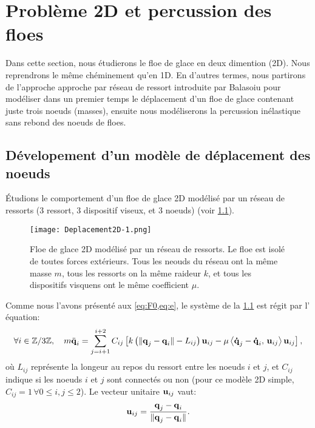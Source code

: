 
\chapter{Problème 2D et percussion des floes} %

\label{Chapter4} %




Dans cette section, nous étudierons le floe de glace en deux dimention (2D). Nous reprendrons le même chéminement qu'en 1D. En d'autres termes, nous partirons de l'approche approche par réseau de ressort introduite par Balasoiu pour modéliser dans un premier temps le déplacement d'un floe de glace contenant juste trois noeuds (masses), ensuite nous modéliserons la percussion inélastique sans rebond des noeuds de floes. 







\section{Dévelopement d'un modèle de déplacement des noeuds}








Étudions le comportement d'un floe de glace 2D modélisé par un réseau de ressorts (3 ressort, 3 dispositif viseux, et 3 noeuds) (voir \cref{fig:deplacement2d}).
\begin{figure}[!h]
    \centering
    \texttt{[image: Deplacement2D-1.png]}
    \caption{Floe de glace 2D modélisé par un réseau de ressorts. Le floe est isolé de toutes forces extérieurs. Tous les neouds du réseau ont la même masse $m$, tous les ressorts on la même raideur $k$, et tous les dispositifs visquens ont le même coefficient $\mu$.}
    \label{fig:deplacement2d}
\end{figure}


\noindent Comme nous l'avons présenté aux \cref{eq:F0,eq:e}, le système de la \cref{fig:deplacement2d} est régit par l' équation:
\begin{align} \label{eq:eprime2}
    \forall i \in \mathbb{Z}/3\mathbb{Z}, \quad m \ddot{\bm{\mathrm{q}}}_i = \sum_{j=i+1}^{i+2}C_{ij} \left[  k \left( \Vert \bm{\mathrm{q}}_j - \bm{\mathrm{q}}_i \Vert - L_{ij} \right) \bm{\mathrm{u}}_{ij} - \mu \left\langle \bm{\mathrm{\dot{q}}}_j - \bm{\mathrm{\dot{q}}}_i, \, \bm{\mathrm{u}}_{ij}  \right\rangle  \bm{\mathrm{u}}_{ij}  \right]  , 
\end{align}
où $L_{ij}$ représente la longeur au repos du ressort entre les noeuds $i$ et $j$, et $C_{ij}$ indique si les noeuds $i$ et $j$ sont connectés ou non (pour ce modèle 2D simple, $C_{ij} = 1 \, \forall 0 \leq i,j \leq 2$). Le vecteur unitaire $\bm{\mathrm{u}}_{ij}$ vaut:
$$
\bm{\mathrm{u}}_{ij} = \frac{\bm{\mathrm{q}}_j - \bm{\mathrm{q}}_i}{\Vert \bm{\mathrm{q}}_j - \bm{\mathrm{q}}_i \Vert}.
$$



